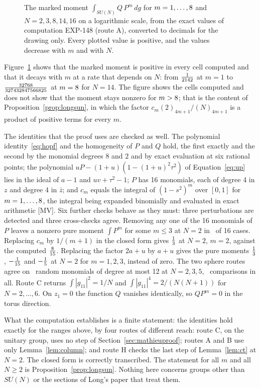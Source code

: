 \documentclass[11pt]{article}
\theoremstyle{remark}
\begin{document}
\begin{figure}[t]
\centering

\caption{The marked moment $\int_{SU(N)}Q\,P^m\,dg$ for $m=1,\dots,8$ and $N=2,3,8,14,16$ on a logarithmic scale, from the exact values of computation EXP-148 (route A), converted to decimals for the drawing only. Every plotted value is positive, and the values decrease with $m$ and with $N$.}
\label{fig:mathieu}
\end{figure}

Figure~\ref{fig:mathieu} shows that the marked moment is positive in every cell computed and that it decays with $m$ at a rate that depends on $N$: from $\tfrac{1}{2142}$ at $m=1$ to $\tfrac{32768}{327432847566825}$ at $m=8$ for $N=14$. The figure shows the cells computed and does not show that the moment stays nonzero for $m>8$; that is the content of Proposition~\ref{prop:longsun}, in which the factor $c_m(2)_{4m+1}/(N)_{4m+1}$ is a product of positive terms for every $m$.

The identities that the proof uses are checked as well. The polynomial identity~\eqref{eq:hopf} and the homogeneity of $P$ and $Q$ hold, the first exactly and the second by the monomial degrees $8$ and $2$ and by exact evaluation at six rational points; the polynomial $uP-(1+u)(1-(1+u)^2\tau^2)$ of Equation~\eqref{eq:up} lies in the ideal of $a-1$ and $uv+\tau^2-1$; $P$ has 16 monomials, each of degree 4 in $z$ and degree 4 in $\bar z$; and $c_m$ equals the integral of $(1-s^2)^m$ over $[0,1]$ for $m=1,\dots,8$, the integral being expanded binomially and evaluated in exact arithmetic [MV]. Six further checks behave as they must: three perturbations are detected and three cross-checks agree. Removing any one of the 16 monomials of $P$ leaves a nonzero pure moment $\int P^m$ for some $m\le3$ at $N=2$ in \nmckoneremoved\ of 16 cases. Replacing $c_m$ by $1/(m+1)$ in the closed form gives $\tfrac{1}{3}$ at $N=2$, $m=2$, against the computed $\tfrac{8}{15}$. Replacing the factor $2a+u$ by $a+u$ gives the pure moments $\tfrac{1}{3}$, $-\tfrac{1}{15}$ and $-\tfrac{1}{5}$ at $N=2$ for $m=1,2,3$, instead of zero. The two sphere routes agree on \nmckfourmon\ random monomials of degree at most 12 at $N=2,3,5$, \nmckfourcmp\ comparisons in all. Route C returns $\int|g_{11}|^2=1/N$ and $\int|g_{11}|^4=2/(N(N+1))$ for $N=2,\dots,6$. On $z_1=0$ the function $Q$ vanishes identically, so $QP^m=0$ in the torus direction.

What the computation establishes is a finite statement: the identities hold exactly for the ranges above, by four routes of different reach: route C, on the unitary group, uses no step of Section~\ref{sec:mathieuproof}; routes A and B use only Lemma~\ref{lem:column}; and route H checks the last step of Lemma~\ref{lem:ct} at $N=2$. The closed form is correctly transcribed. The statement for all $m$ and all $N\ge2$ is Proposition~\ref{prop:longsun}. Nothing here concerns groups other than $SU(N)$ or the sections of Long's paper that treat them.
\end{document}
